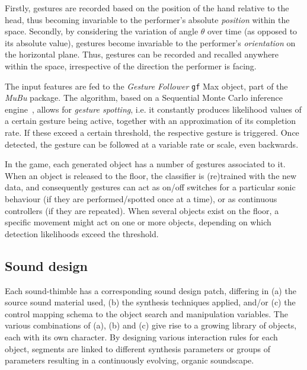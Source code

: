Firstly, gestures are recorded based on the position of the hand relative to the head, thus becoming invariable to the performer's absolute \textit{position} within the space. Secondly, by considering the variation of angle $\theta$ over time (as opposed to its absolute value), gestures become invariable to the performer's \textit{orientation} on the horizontal plane. Thus, gestures can be recorded and recalled anywhere within the space, irrespective of the direction the performer is facing.

The input features are fed to the \textit{Gesture Follower} \texttt{gf} Max object, part of the \textit{MuBu} package. The algorithm, based on a Sequential Monte Carlo inference engine~\cite{caramiaux2015adaptive}, allows for \textit{gesture spotting}, i.e. it constantly produces likelihood values of a certain gesture being active, together with an approximation of its completion rate. If these exceed a certain threshold, the respective gesture is triggered. Once detected, the gesture can be followed at a variable rate or scale, even backwards. %

In the game, each generated object has a number of gestures associated to it. When an object is released to the floor, the classifier is (re)trained with the new data, and consequently gestures can act as on/off switches for a particular sonic behaviour (if they are performed/spotted once at a time), or as continuous controllers (if they are repeated). When several objects exist on the floor, a specific movement might act on one or more objects, depending on which detection likelihoods exceed the threshold. 


\subsection{Sound design}


Each sound-thimble has a corresponding sound design patch, differing in (a) the source sound material used, (b) the synthesis techniques applied, and/or (c) the control mapping schema to the object search and manipulation variables. The various combinations of (a), (b) and (c) give rise to a growing library of objects, each with its own character. By designing various interaction rules for each object, segments are linked to different synthesis parameters or groups of parameters resulting in a continuously evolving, organic soundscape.

